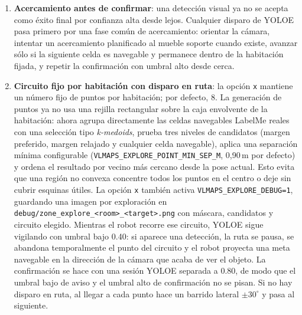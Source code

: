 \documentclass[11pt,a4paper]{article}
\begin{document}
\begin{enumerate}
        dominio interior generado.
  \item \textbf{Acercamiento antes de confirmar}: una detección visual ya no
        se acepta como éxito final por confianza alta desde lejos. Cualquier
        disparo de YOLOE pasa primero por una fase común de acercamiento:
        orientar la cámara, intentar un acercamiento planificado al mueble
        soporte cuando existe, avanzar sólo si la siguiente celda es navegable
        y permanece dentro de la habitación fijada, y repetir la confirmación
        con umbral alto desde cerca.
  \item \textbf{Circuito fijo por habitación con disparo en ruta}: la opción
        \texttt{x} mantiene un número fijo de puntos por habitación; por
        defecto, 8. La generación de puntos ya no usa una rejilla rectangular
        sobre la caja envolvente de la habitación: ahora agrupa directamente las
        celdas navegables LabelMe reales con una selección tipo
        \emph{k-medoids}, prueba tres niveles de candidatos
        (margen preferido, margen relajado y cualquier celda navegable), aplica
        una separación mínima configurable
        (\texttt{VLMAPS\_EXPLORE\_POINT\_MIN\_SEP\_M}, 0,90\,m por defecto) y
        ordena el resultado por vecino más cercano desde la pose actual. Esto
        evita que una región no convexa concentre todos los puntos en el centro
        o deje sin cubrir esquinas útiles. La opción \texttt{x} también activa
        \texttt{VLMAPS\_EXPLORE\_DEBUG=1}, guardando una imagen por exploración
        en \texttt{debug/zone\_explore\_<room>\_<target>.png} con máscara,
        candidatos y circuito elegido. Mientras el robot recorre ese circuito,
        YOLOE sigue vigilando con umbral bajo
        0.40: si aparece una detección, la ruta se pausa, se abandona
        temporalmente el punto del circuito y el robot proyecta una meta
        navegable en la dirección de la cámara que acaba de ver el objeto. La
        confirmación se hace con una sesión YOLOE separada a 0.80, de modo que
        el umbral bajo de aviso y el umbral alto de confirmación no se pisan.
        Si no hay disparo en ruta, al llegar a cada punto hace un barrido
        lateral $\pm 30^\circ$ y pasa al siguiente.
\end{enumerate}
\end{document}
